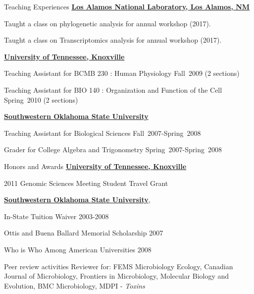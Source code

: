 \documentclass{resume} %
\begin{document}
\begin{rSection}{Teaching Experiences}{}{}{}
\href{http://www.lanl.gov}{\bf Los Alamos National Laboratory, Los Alamos, NM }
\item Taught a class on phylogenetic analysis for annual workshop (2017).
\item Taught a class on Transcriptomics analysis for annual workshop (2017).

\href{http://www.utk.edu}{\bf University of Tennessee, Knoxville}
\item Teaching Assistant for BCMB 230 : Human Physiology Fall~2009 (2 sections)
\item Teaching Assistant for BIO 140 : Organization and Function of the Cell  Spring~2010 (2 sections)

\href{http://www.swosu.edu}{\textbf{Southwestern Oklahoma State University}}
 \item Teaching Assistant for Biological Sciences Fall~2007-Spring~2008
\item Grader for College Algebra and Trigonometry Spring~2007-Spring~2008

\end{rSection}


\begin{rSection}{Honors and Awards}
\href{http://www.utk.edu}{\textbf{University of Tennessee, Knoxville}}
\item 2011 Genomic Sciences Meeting Student Travel Grant

\item \href{http://www.swosu.edu}{\textbf{Southwestern Oklahoma State University}},
\item In-State Tuition Waiver 2003-2008
\item Ottis and Buena Ballard Memorial Scholarship 2007
\item Who is Who Among American Universities 2008
\end{rSection}


\begin{rSection}{Peer review activities}
Reviewer for: FEMS Microbiology Ecology, Canadian Journal of Microbiology, Frontiers in Microbiology, Molecular Biology and Evolution, BMC Microbiology, MDPI - \textit{Toxins}
\end{rSection}
\end{document}
